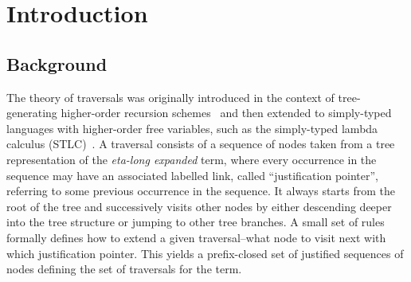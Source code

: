 \documentclass[xchauthor,chkrefs,GCNS,amsmath,amsthm,rotating,leaveRGB]{tcsg}
\theoremstyle{plain}
\theoremstyle{definition}
\begin{document}
\begin{frontmatter}
\begin{abstract}[class=author-highlights,title=Highlights]
\begin{itemize}
    eta-
\item The traversal does not involve the traditional substitution from
    lambda-
\item The procedure can be viewed as an implementation of head linear
\item The procedure terminates and yields the normal form if it
\end{itemize}
\end{abstract}
%
%
%
\begin{keyword}  %
\end{keyword}
\end{frontmatter}



\section{Introduction}\label{sec1}

\subsection{Background}\label{sec1.1}

The theory of traversals was originally introduced in the context of
tree-generating higher-order recursion schemes~\cite{OngLics2006} and then
extended to simply-typed languages with higher-order free variables, such as
the simply-typed lambda calculus (STLC)~\cite{BlumPhd}. A traversal consists
of a sequence of nodes taken from a tree representation of the \emph{eta-long
expanded} term, where every occurrence in the sequence may have an associated
labelled link, called ``justification pointer'', referring to some previous
occurrence in the sequence. It always starts from the root of the tree and
successively visits other nodes by either descending deeper into the tree
structure or jumping to other tree branches. A small set of rules formally
defines how to extend a given traversal--what node to visit next with which
justification pointer. This yields a prefix-closed set of justified sequences
of nodes defining the set of traversals for the term.
\end{document}
